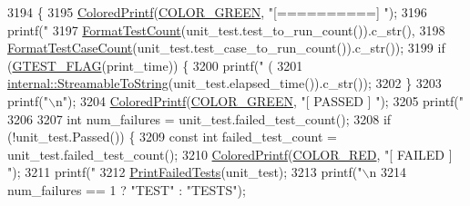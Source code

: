 \begin{DoxyCode}
3194                                                             \{
3195   \hyperlink{namespacetesting_1_1internal_adef3055706176001364e54eb73a87e31}{ColoredPrintf}(\hyperlink{namespacetesting_1_1internal_a648c1bc94c2ef9e868ff3f9dff0f9c4ea3b1e81f5b14a17b35a8672d57d166507}{COLOR\_GREEN},  \textcolor{stringliteral}{"[==========] "});
3196   printf(\textcolor{stringliteral}{"%
3197          \hyperlink{namespacetesting_a7420a0eb48a02ba210e265afb75febdf}{FormatTestCount}(unit\_test.test\_to\_run\_count()).c\_str(),
3198          \hyperlink{namespacetesting_ab8cabb45f3d8c52d336372c1b62d75c5}{FormatTestCaseCount}(unit\_test.test\_case\_to\_run\_count()).c\_str());
3199   \textcolor{keywordflow}{if} (\hyperlink{gtest-port_8h_a828f4e34a1c4b510da50ec1563e3562a}{GTEST\_FLAG}(print\_time)) \{
3200     printf(\textcolor{stringliteral}{" (%
3201            \hyperlink{namespacetesting_1_1internal_aad4beed95d0846e6ffc5da0978ef3bb9}{internal::StreamableToString}(unit\_test.elapsed\_time()).c\_str());
3202   \}
3203   printf(\textcolor{stringliteral}{"\(\backslash\)n"});
3204   \hyperlink{namespacetesting_1_1internal_adef3055706176001364e54eb73a87e31}{ColoredPrintf}(\hyperlink{namespacetesting_1_1internal_a648c1bc94c2ef9e868ff3f9dff0f9c4ea3b1e81f5b14a17b35a8672d57d166507}{COLOR\_GREEN},  \textcolor{stringliteral}{"[  PASSED  ] "});
3205   printf(\textcolor{stringliteral}{"%
3206 
3207   \textcolor{keywordtype}{int} num\_failures = unit\_test.failed\_test\_count();
3208   \textcolor{keywordflow}{if} (!unit\_test.Passed()) \{
3209     \textcolor{keyword}{const} \textcolor{keywordtype}{int} failed\_test\_count = unit\_test.failed\_test\_count();
3210     \hyperlink{namespacetesting_1_1internal_adef3055706176001364e54eb73a87e31}{ColoredPrintf}(\hyperlink{namespacetesting_1_1internal_a648c1bc94c2ef9e868ff3f9dff0f9c4ea9ebb3ddab9391781f6ee5021e1e443c3}{COLOR\_RED},  \textcolor{stringliteral}{"[  FAILED  ] "});
3211     printf(\textcolor{stringliteral}{"%
3212     \hyperlink{classtesting_1_1internal_1_1PrettyUnitTestResultPrinter_aca5a9dc08998948e293b307d931b3f86}{PrintFailedTests}(unit\_test);
3213     printf(\textcolor{stringliteral}{"\(\backslash\)n%
3214                         num\_failures == 1 ? \textcolor{stringliteral}{"TEST"} : \textcolor{stringliteral}{"TESTS"});
}}}}}
\end{DoxyCode}

